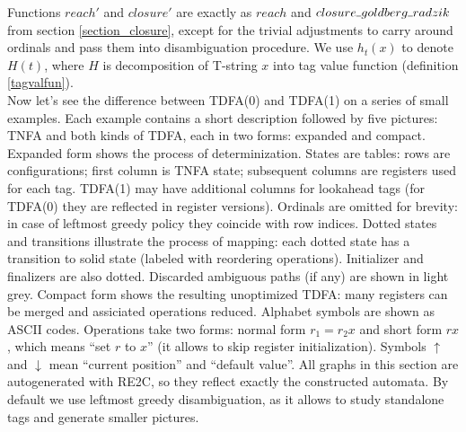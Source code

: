 \documentclass{article}
\newcommand{\Xund}{\rule{.4em}{.4pt}} %
\newcommand{\Xeq}{\!=\!}
\theoremstyle{definition}
\begin{document}
\begin{multicols}{2}
Functions $reach'$ and $closure'$ are exactly as
$reach$ and $closure \Xund goldberg \Xund radzik$ from section \ref{section_closure},
except for the trivial adjustments to carry around ordinals and pass them into disambiguation procedure.
We use $h_t(x)$ to denote $H(t)$, where $H$ is decomposition of T-string $x$ into tag value function (definition \ref{tagvalfun}).
\\

Now let's see the difference between TDFA(0) and TDFA(1) on a series of small examples.
Each example contains a short description followed by five pictures:
TNFA and both kinds of TDFA, each in two forms: expanded and compact.
Expanded form shows the process of determinization.
States are tables: rows are configurations; first column is TNFA state;
subsequent columns are registers used for each tag.
TDFA(1) may have additional columns for lookahead tags (for TDFA(0) they are reflected in register versions).
Ordinals are omitted for brevity: in case of leftmost greedy policy they coincide with row indices.
Dotted states and transitions illustrate the process of mapping:
each dotted state has a transition to solid state (labeled with reordering operations).
Initializer and finalizers are also dotted.
Discarded ambiguous paths (if any) are shown in light grey.
Compact form shows the resulting unoptimized TDFA: many registers can be merged and assiciated operations reduced.
Alphabet symbols are shown as ASCII codes.
Operations take two forms: normal form $r_1 \Xeq r_2 x$
and short form $r x$, which means ``set $r$ to $x$'' (it allows to skip register initialization).
Symbols $\uparrow$ and $\downarrow$ mean ``current position'' and ``default value''.
All graphs in this section are autogenerated with RE2C, so they reflect exactly the constructed automata.
By default we use leftmost greedy disambiguation, as it allows to study standalone tags and generate smaller pictures.
\\


\end{multicols}
\end{document}
